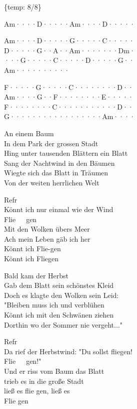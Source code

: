 \documentclass[
  letterpaper,
  a5paper]{memoir}
\begin{document}
\{temp: 8/8\}

Am····\textbar D·····\textbar Am····\textbar D·····\textbar{}

Am····\textbar D·····\textbar G·····\textbar C·····\textbar{}\\
D·····\textbar G··A··\textbar Am····\textbar···Dm·\textbar{}\\
···G··\textbar···C··\textbar···D··\textbar···G··\textbar{}\\
Am····\textbar······\textbar{}

F·····\textbar G·····\textbar C·····\textbar···D··\textbar{}\\
Am····\textbar G··F··\textbar······\textbar E·····\textbar{}\\
F·····\textbar···C··\textbar······\textbar···D··\textbar{}\\
G·····\textbar······\textbar······\textbar Am····\textbar{}

An einem Baum\\
In dem Park der grossen Stadt\\
Hing unter tausenden Blättern ein Blatt\\
Sang der Nachtwind in den Bäumen\\
Wiegte sich das Blatt in Träumen\\
Von der weiten herrlichen Welt

Refr\\
Könnt ich nur einmal wie der Wind\\
Flie~~~gen\\
Mit den Wolken übers Meer\\
Ach mein Leben gäb ich her\\
Könnt ich Flie-gen\\
Könnt ich Fliegen

Bald kam der Herbst\\
Gab dem Blatt sein schönstes Kleid\\
Doch es klagte den Wolken sein Leid:\\
"Bleiben muss ich und verblühen\\
Könnt ich mit den Schwänen ziehen\\
Dorthin wo der Sommer nie vergeht..."

Refr\\
Da rief der Herbstwind: "Du sollst fliegen!\\
Flie~~~gen!"\\
Und er riss vom Baum das Blatt\\
trieb es in die große Stadt\\
ließ es flie gen, ließ es\\
Flie gen
\end{document}
